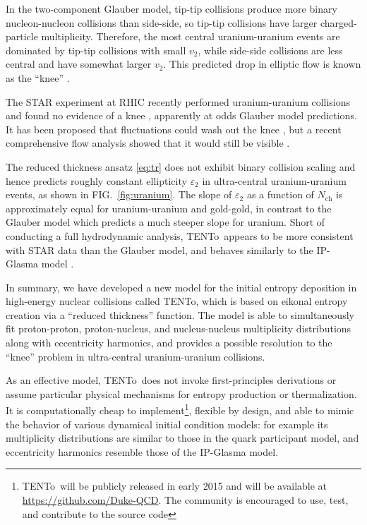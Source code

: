 \documentclass[aps,prc,reprint,amsmath,nofootinbib]{revtex4-1}
\newcommand{\trento}{T\raisebox{-.5ex}{R}ENTo}
\newcommand{\nch}{N_\text{ch}}
\begin{document}
In the two-component Glauber model, tip-tip collisions produce more binary nucleon-nucleon collisions than side-side, so tip-tip collisions have larger charged-particle multiplicity.
Therefore, the most central uranium-uranium events are dominated by tip-tip collisions with small $v_2$, while side-side collisions are less central and have somewhat larger $v_2$.
This predicted drop in elliptic flow is known as the ``knee'' \cite{Voloshin:2010ut}.

The STAR experiment at RHIC recently performed uranium-uranium collisions and found no evidence of a knee \cite{FortheSTAR:2013bza,Wang:2014qxa}, apparently at odds Glauber model predictions.
It has been proposed that fluctuations could wash out the knee \cite{Rybczynski:2012av}, but a recent comprehensive flow analysis showed that it would still be visible \cite{}.

The reduced thickness ansatz \eqref{eq:tr} does not exhibit binary collision scaling and hence predicts roughly constant ellipticity $\varepsilon_2$ in ultra-central uranium-uranium events, as shown in FIG.~\ref{fig:uranium}.
The slope of $\varepsilon_2$ as a function of $\nch$ is approximately equal for uranium-uranium and gold-gold, in contrast to the Glauber model which predicts a much steeper slope for uranium.
Short of conducting a full hydrodynamic analysis, \trento\ appears to be more consistent with STAR data than the Glauber model, and behaves similarly to the IP-Glasma model \cite{Wang:2014qxa}.


In summary, we have developed a new model for the initial entropy deposition in high-energy nuclear collisions called \trento, which is based on
eikonal entropy creation via a ``reduced thickness'' function.  The model is able to simultaneously fit
proton-proton, proton-nucleus, and nucleus-nucleus multiplicity distributions along with  eccentricity harmonics, and provides a possible resolution to the ``knee'' problem in ultra-central uranium-uranium
collisions.

As an effective model, \trento\ does not invoke first-principles derivations or assume particular physical mechanisms for entropy production or thermalization.
It is computationally cheap to implement\footnote{\trento\ will be publicly released in early 2015 and will be available at \url{https://github.com/Duke-QCD}. The community is encouraged to use, test, and contribute to the source code}, flexible by design, and able to mimic the behavior of various dynamical initial condition models:
for example its multiplicity distributions are similar to those in the quark participant model, and eccentricity harmonics resemble those of the IP-Glasma model.
\end{document}
